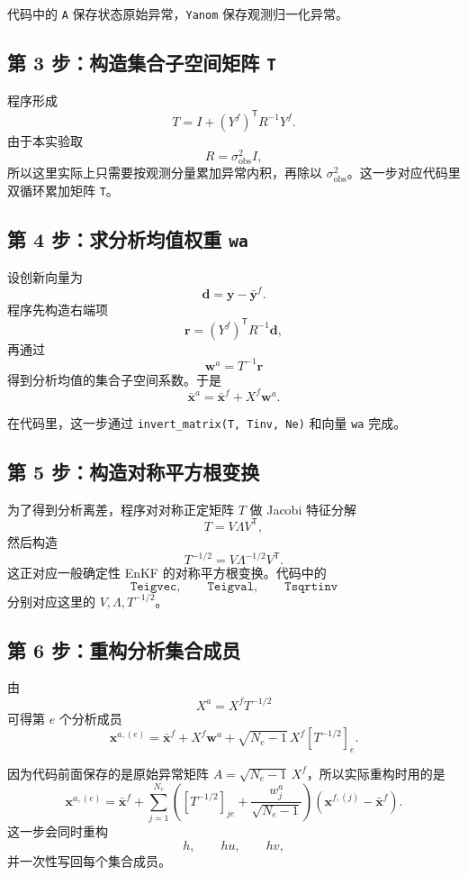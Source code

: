 \documentclass[12pt,a4paper]{article}
\begin{document}
代码中的 \texttt{A} 保存状态原始异常，\texttt{Yanom} 保存观测归一化异常。

\subsection{第 3 步：构造集合子空间矩阵 \texttt{T}}

程序形成
\[
T = I + (Y^f)^{\mathsf T} R^{-1} Y^f.
\]
由于本实验取
\[
R = \sigma_{\mathrm{obs}}^2 I,
\]
所以这里实际上只需要按观测分量累加异常内积，再除以 $\sigma_{\mathrm{obs}}^2$。这一步对应代码里双循环累加矩阵 \texttt{T}。

\subsection{第 4 步：求分析均值权重 \texttt{wa}}

设创新向量为
\[
\mathbf{d} = \mathbf{y} - \bar{\mathbf{y}}^f.
\]
程序先构造右端项
\[
\mathbf{r} = (Y^f)^{\mathsf T} R^{-1}\mathbf{d},
\]
再通过
\[
\mathbf{w}^a = T^{-1}\mathbf{r}
\]
得到分析均值的集合子空间系数。于是
\[
\bar{\mathbf{x}}^a = \bar{\mathbf{x}}^f + X^f \mathbf{w}^a.
\]

在代码里，这一步通过 \texttt{invert\_matrix(T, Tinv, Ne)} 和向量 \texttt{wa} 完成。

\subsection{第 5 步：构造对称平方根变换}

为了得到分析离差，程序对对称正定矩阵 $T$ 做 Jacobi 特征分解
\[
T = V \Lambda V^{\mathsf T},
\]
然后构造
\[
T^{-1/2} = V \Lambda^{-1/2} V^{\mathsf T}.
\]
这正对应一般确定性 EnKF 的对称平方根变换。代码中的
\[
\texttt{Teigvec},\qquad \texttt{Teigval},\qquad \texttt{Tsqrtinv}
\]
分别对应这里的 $V,\Lambda,T^{-1/2}$。

\subsection{第 6 步：重构分析集合成员}

由
\[
X^a = X^f T^{-1/2}
\]
可得第 $e$ 个分析成员
\[
\mathbf{x}^{a,(e)}
= \bar{\mathbf{x}}^f
+ X^f \mathbf{w}^a
+ \sqrt{N_e-1}\, X^f [T^{-1/2}]_e.
\]

因为代码前面保存的是原始异常矩阵 $A=\sqrt{N_e-1}\,X^f$，所以实际重构时用的是
\[
\mathbf{x}^{a,(e)}
= \bar{\mathbf{x}}^f
+ \sum_{j=1}^{N_e}
\left(
[T^{-1/2}]_{j e} + \frac{w_j^a}{\sqrt{N_e-1}}
\right)
\left(\mathbf{x}^{f,(j)}-\bar{\mathbf{x}}^f\right).
\]
这一步会同时重构
\[
h,\qquad hu,\qquad hv,
\]
并一次性写回每个集合成员。
\end{document}
